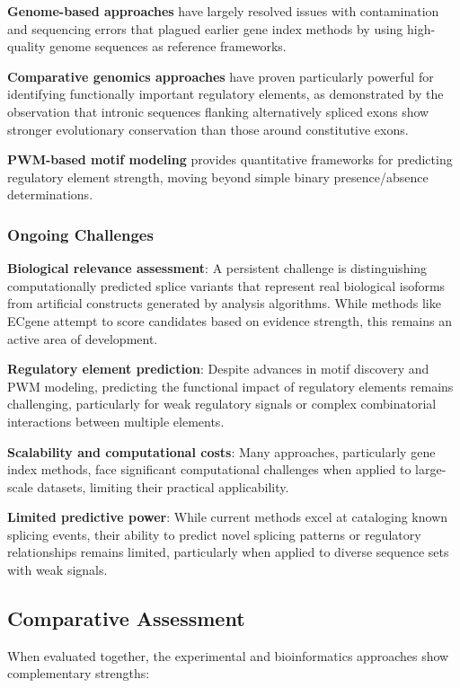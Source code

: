 \documentclass[12pt,a4paper]{article}
\begin{document}
\textbf{Genome-based approaches} have largely resolved issues with contamination and sequencing errors that plagued earlier gene index methods by using high-quality genome sequences as reference frameworks.

\textbf{Comparative genomics approaches} have proven particularly powerful for identifying functionally important regulatory elements, as demonstrated by the observation that intronic sequences flanking alternatively spliced exons show stronger evolutionary conservation than those around constitutive exons.

\textbf{PWM-based motif modeling} provides quantitative frameworks for predicting regulatory element strength, moving beyond simple binary presence/absence determinations.

\subsubsection{Ongoing Challenges}

\textbf{Biological relevance assessment}: A persistent challenge is distinguishing computationally predicted splice variants that represent real biological isoforms from artificial constructs generated by analysis algorithms. While methods like ECgene attempt to score candidates based on evidence strength, this remains an active area of development.

\textbf{Regulatory element prediction}: Despite advances in motif discovery and PWM modeling, predicting the functional impact of regulatory elements remains challenging, particularly for weak regulatory signals or complex combinatorial interactions between multiple elements.

\textbf{Scalability and computational costs}: Many approaches, particularly gene index methods, face significant computational challenges when applied to large-scale datasets, limiting their practical applicability.

\textbf{Limited predictive power}: While current methods excel at cataloging known splicing events, their ability to predict novel splicing patterns or regulatory relationships remains limited, particularly when applied to diverse sequence sets with weak signals.

\subsection{Comparative Assessment}

When evaluated together, the experimental and bioinformatics approaches show complementary strengths:
\end{document}
